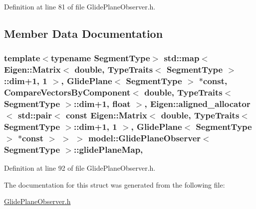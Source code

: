 Definition at line 81 of file Glide\+Plane\+Observer.\+h.



\subsection{Member Data Documentation}
\hypertarget{structmodel_1_1_glide_plane_observer_a7ed557e3e1e5c77b9804d20b868b48e0}{}
\subsubsection[{glide\+Plane\+Map}]{\setlength{\rightskip}{0pt plus 5cm}template$<$typename Segment\+Type$>$ std\+::map$<$ Eigen\+::\+Matrix$<$ double, {\bf Type\+Traits}$<$ Segment\+Type $>$\+::{\bf dim}+1, 1 $>$, {\bf Glide\+Plane}$<$ Segment\+Type $>$ $\ast$const, {\bf Compare\+Vectors\+By\+Component}$<$ double, {\bf Type\+Traits}$<$ Segment\+Type $>$\+::{\bf dim}+1, float $>$, Eigen\+::aligned\+\_\+allocator$<$ std\+::pair$<$ const Eigen\+::\+Matrix$<$ double, {\bf Type\+Traits}$<$ Segment\+Type $>$\+::{\bf dim}+1, 1 $>$, {\bf Glide\+Plane}$<$ Segment\+Type $>$ $\ast$const  $>$ $>$ $>$ {\bf model\+::\+Glide\+Plane\+Observer}$<$ Segment\+Type $>$\+::glide\+Plane\+Map\hspace{0.3cm}{\ttfamily [static]}, {\ttfamily [protected]}}\label{structmodel_1_1_glide_plane_observer_a7ed557e3e1e5c77b9804d20b868b48e0}


Definition at line 92 of file Glide\+Plane\+Observer.\+h.



The documentation for this struct was generated from the following file\+:\begin{DoxyCompactItemize}
\item 
\hyperlink{_glide_plane_observer_8h}{Glide\+Plane\+Observer.\+h}\end{DoxyCompactItemize}
